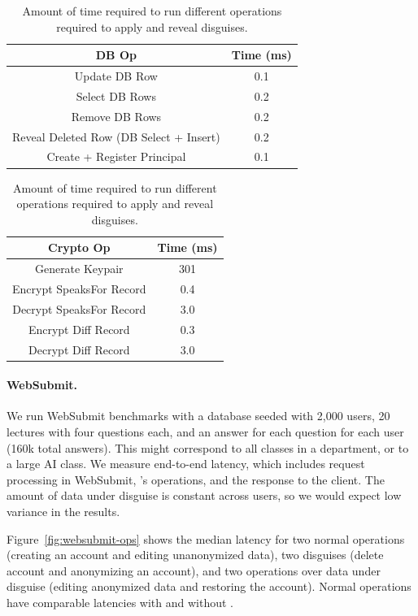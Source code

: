 \begin{table}[h!]
\begin{center}
\begin{tabular}{ c c }
\textbf{DB Op} & \textbf{Time (ms)}\\
\hline
Update DB Row & 0.1\\
Select DB Rows & 0.2\\
Remove DB Rows & 0.2\\
Reveal Deleted Row (DB Select + Insert) & 0.2 \\
Create + Register Principal & 0.1\\
\end{tabular}
\quad
\begin{tabular}{ c c }
\textbf{Crypto Op} & \textbf{Time (ms)}\\
\hline
Generate Keypair & 301\\
Encrypt SpeaksFor Record & 0.4\\
Decrypt SpeaksFor Record & 3.0\\
Encrypt Diff Record & 0.3\\
Decrypt Diff Record & 3.0\\
\end{tabular}
\end{center}
\caption{Amount of time required to run different operations required to apply and reveal disguises.}
\label{tab:opstats}
\end{table}

\paragraph{WebSubmit.}
%
We run WebSubmit benchmarks with a database seeded with 2,000 users, 20
lectures with four questions each, and an answer for each question for
each user (160k total answers).
%
This might correspond to all classes in a department, or to a large AI class.
%
We measure end-to-end latency, which includes request processing in WebSubmit,
\sys's operations, and the response to the client.
%
The amount of data under disguise is constant across users, so we would expect
low variance in the results.
%

%
Figure~\ref{fig:websubmit-ops} shows the median latency for two normal operations
(creating an account and editing unanonymized data), two disguises (delete account
and anonymizing an account), and two operations over data under disguise (editing
anonymized data and restoring the account).
%
Normal operations have comparable latencies with and without \sys.
%

